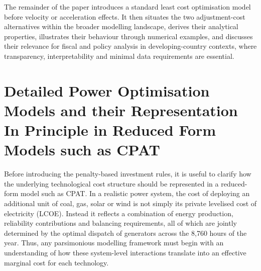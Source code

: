 \documentclass[preprint,authoryear,12pt]{elsarticle}
\begin{document}
The remainder of the paper introduces a standard least cost optimisation model before velocity or acceleration effects. It then situates the two adjustment-cost alternatives within the broader modelling landscape, derives their analytical properties, illustrates their behaviour through numerical examples, and
discusses their relevance for fiscal and policy analysis in developing-country contexts, where transparency, interpretability and minimal data requirements are essential.





\newpage
\section{Detailed Power Optimisation Models and their Representation In Principle in Reduced Form Models such as CPAT}

Before introducing the penalty-based investment rules, it is useful to clarify how the underlying
technological cost structure should be represented in a reduced-form model such as CPAT. In a
realistic power system, the cost of deploying an additional unit of coal, gas, solar or wind is not
simply its private levelised cost of electricity (LCOE). Instead it reflects a combination of energy
production, reliability contributions and balancing requirements, all of which are jointly
determined by the optimal dispatch of generators across the 8,760 hours of the year. Thus, any
parsimonious modelling framework must begin with an understanding of how these
system-level interactions translate into an effective marginal cost for each technology.
\end{document}
